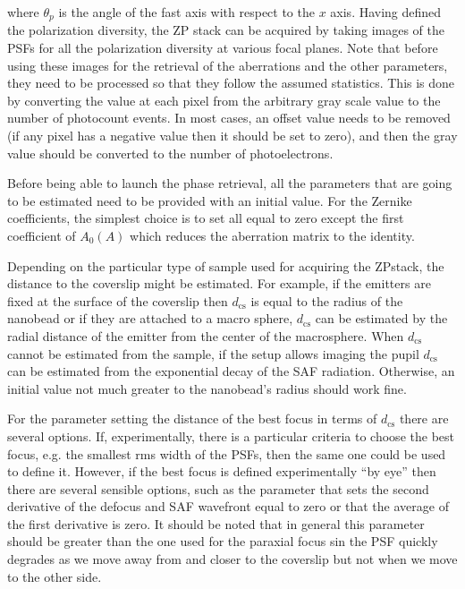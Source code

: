 \documentclass[reprint,aps,pra,superscriptaddress,
amsmath,amssymb]{revtex4-1}
\begin{document}
where $\theta_p$ is the angle of the fast axis with respect to the $x$ axis.
Having defined the polarization diversity, the ZP stack can be acquired by taking images of the PSFs for all the polarization diversity at various focal planes. Note that before using these images for the retrieval of the aberrations and the other parameters, they need to be processed so that they follow the assumed statistics. This is done by converting the value at each pixel from the arbitrary gray scale value to the number of photocount events. In most cases, an offset value needs to be removed (if any pixel has a negative value then it should be set to zero), and then the gray value should be converted to the number of photoelectrons. 

Before being able to launch the phase retrieval, all the parameters that are going to be estimated need to be provided with an initial value. For the Zernike coefficients, the simplest choice is to set all equal to zero except the first coefficient of $A_0{(A)}$ which reduces the aberration matrix to the identity.
 
Depending on the particular type of sample used for acquiring the ZPstack, the distance to the coverslip might be estimated. For example, if the emitters are fixed at the surface of the coverslip then $d_\text{cs}$ is equal to the radius of the nanobead or if they are attached to a macro sphere, $d_\text{cs}$ can be estimated by the radial distance of the emitter from the center of the macrosphere. When $d_\text{cs}$ cannot be estimated from the sample, if the setup allows imaging the pupil $d_\text{cs}$ can be estimated from the exponential decay of the SAF radiation. Otherwise, an initial value not much greater to the nanobead's radius should work fine. 

For the parameter setting the distance of the best focus in terms of $d_\text{cs}$ there are several options. If, experimentally, there is a particular criteria to choose the best focus, e.g. the smallest rms width of the PSFs, then the same one could be used to define it. However, if the best focus is defined experimentally ``by eye'' then there are several sensible options, such as the parameter that  sets the second derivative of the defocus and SAF wavefront equal to zero or that the average of the first derivative is zero. It should be noted that in general this parameter should be greater than the one used for the paraxial focus sin the PSF quickly degrades as we move away from and closer to the coverslip but not when we move to the other side. 
\end{document}
